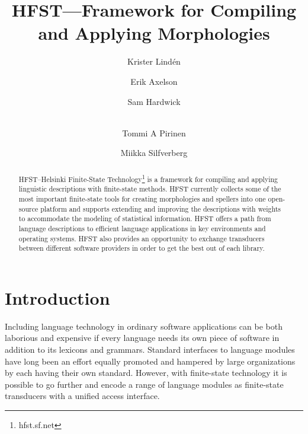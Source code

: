 \documentclass{llncs}
\begin{document}
%
\title{HFST---Framework for Compiling and Applying Morphologies}
%
\author{Krister Lind\'{e}n \and Erik Axelson \and Sam Hardwick \and\\
Tommi A Pirinen \and Miikka Silfverberg}


\maketitle


\begin{abstract}
HFST--Helsinki Finite-State Technology\footnote{hfst.sf.net}
is a framework for compiling and applying linguistic descriptions with
finite-state methods. 
HFST currently collects some of the most important finite-state tools for creating
morphologies and spellers into one open-source platform and supports
extending and improving the descriptions with weights to accommodate the modeling of
statistical information.
HFST offers a path from language descriptions to efficient language applications 
in key environments and operating systems. 
HFST also provides an opportunity to exchange transducers between 
different software providers in order to get the best out of each library. 
\end{abstract}


\section*{Introduction}
Including language technology in ordinary software applications can be
both laborious and expensive if every language needs its own piece of software
in addition to its lexicons and grammars. Standard interfaces
to language modules have long been an effort equally promoted and hampered 
by large organizations by each having their own standard.
However, with finite-state technology it is possible to go further and encode 
a range of language modules as finite-state transducers with a unified
access interface.
\end{document}
